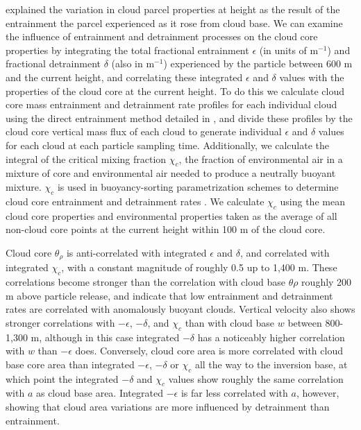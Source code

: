 \documentclass[acp]{copernicus}
\begin{document}
\cite{Romps2010} explained the variation in cloud parcel properties at height 
as the result of the entrainment the parcel experienced as it rose from 
cloud base.  We can examine the influence of entrainment and detrainment 
processes on the cloud core properties by integrating the total fractional 
entrainment $\epsilon$ (in units of m$^{-1}$) and fractional detrainment 
$\delta$ (also in m$^{-1}$) experienced by the particle between 600 m and the 
current height, and correlating these integrated $\epsilon$ and $\delta$ 
values with the properties of the cloud core at the current height.  To do this 
we calculate cloud core mass entrainment and detrainment rate profiles for each 
individual cloud using the direct entrainment method detailed in 
\cite{Dawe2011}, and divide these profiles by the cloud core vertical mass 
flux of each cloud to generate individual $\epsilon$ and $\delta$ values for 
each cloud at each particle sampling time.  Additionally, we calculate the 
integral of the critical mixing fraction $\chi_c$, the fraction of 
environmental air in a mixture of core and environmental air needed to produce 
a neutrally buoyant mixture.  $\chi_c$ is used in buoyancy-sorting 
parametrization schemes to determine cloud core entrainment and detrainment 
rates \citep{Kain1990, Rooy2008}.  We calculate $\chi_c$ using the mean cloud
core properties and environmental properties taken as the average of all 
non-cloud core points at the current height within 100 m of the cloud core.

Cloud core $\theta_\rho$ is anti-correlated with integrated $\epsilon$ and 
$\delta$, and correlated with integrated $\chi_c$, with a constant magnitude 
of roughly 0.5 up to 1,400 m. These correlations become stronger than the 
correlation with cloud base $\theta\rho$ roughly 200 m above particle 
release, and indicate that low entrainment and detrainment rates are correlated 
with anomalously buoyant clouds.  Vertical velocity also shows stronger 
correlations with $-\epsilon$, $-\delta$, and $\chi_c$ than with cloud base 
$w$ between 800-1,300 m, although in this case integrated $-\delta$ has a 
noticeably higher correlation with $w$ than $-\epsilon$ does.  Conversely, 
cloud core area is more correlated with cloud base core area than integrated 
$-\epsilon$, $-\delta$ or $\chi_c$ all the way to the inversion base, at 
which point the integrated $-\delta$ and $\chi_c$ values show roughly the 
same correlation with $a$ as cloud base area.  Integrated $-\epsilon$ is far 
less correlated with $a$, however, showing that cloud area variations are more 
influenced by detrainment than entrainment.
\end{document}
